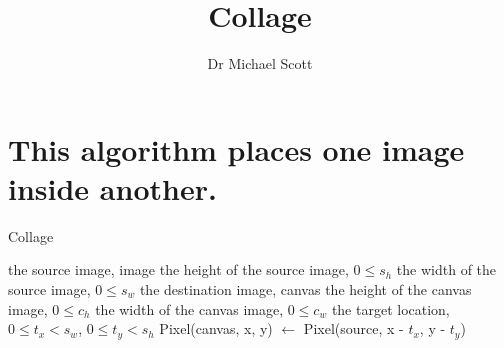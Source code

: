 \documentclass{../../../fal_assignment}
\title{Collage}
\author{Dr Michael Scott}
\begin{document}
\maketitle

\section{This algorithm places one image inside another.}
\begin{algorithm}[ht]
	\caption{Collage}
	\label{alg:algorithm}
	
	\begin{algorithmic}[1]
		\Require
		\Statex the source image, image
		\Statex the height of the source image, $0 \leq s_h$
		\Statex the width of the source image, $0 \leq s_w$
		\Statex the destination image, canvas
		\Statex the height of the canvas image, $0 \leq c_h$
		\Statex the width of the canvas image, $0 \leq c_w$
		\Statex the target location, $0 \leq t_x < s_w$, $0 \leq t_y < s_h$
			\State Pixel(canvas, x, y)  $\leftarrow$ Pixel(source, x - $t_x$,  y - $t_y$)
			\EndIf
			\EndIf
			\EndFor
		\EndProcedure
	\end{algorithmic}
	
\end{algorithm}
\end{document}
